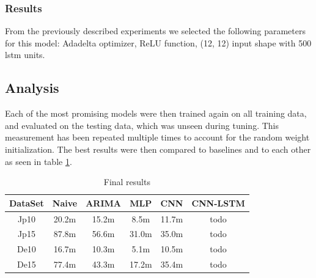 \documentclass[12pt]{article}
\begin{document}
\subsubsection{Results}
From the previously described experiments we selected the following parameters for this model: Adadelta optimizer, ReLU function, (12, 12) input shape with 500 lstm units.

\subsection{Analysis}
Each of the most promising models were then trained again on all training data, and evaluated on the testing data, which was unseen during tuning. This measurement has been repeated multiple times to account for the random weight initialization. The best results were then compared to baselines and to each other as seen in table \ref{tab:final_results}.

\begin{table}[htbp]
\caption{Final results}
\begin{center}
\begin{tabular}{|c|c|c|c|c|c|}
\hline
DataSet & Naive & ARIMA & MLP & CNN & CNN-LSTM \\
\hline
Jp10& 20.2m & 15.2m & 8.5m & 11.7m & todo\\
\hline
Jp15 & 87.8m & 56.6m & 31.0m & 35.0m & todo\\
\hline
De10 & 16.7m & 10.3m & 5.1m & 10.5m & todo\\
\hline
De15 & 77.4m & 43.3m & 17.2m & 35.4m & todo\\
\hline
\end{tabular}
\label{tab:final_results}
\end{center}
\end{table}


  \newpage
  {}
  
\end{document}
